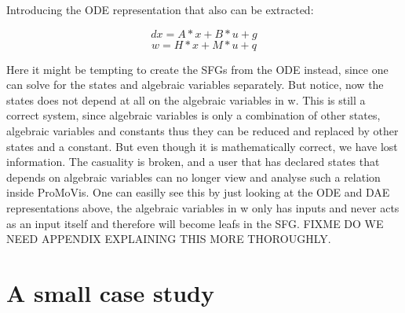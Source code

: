 Introducing the ODE representation that also can be extracted:

\begin{equation}
dx = A*x + B*u + g
\end{equation}
\begin{equation}
w  = H*x + M*u + q
\end{equation}

Here it might be tempting to create the SFGs from the ODE instead, since one can solve for the states and algebraic variables separately. But notice, now the states does not depend at all on the algebraic variables in w. This is still a correct system, since algebraic variables is only a combination of other states, algebraic variables and constants thus they can be reduced and replaced by other states and a constant. But even though it is mathematically correct, we have lost information. The casuality is broken, and a user that has declared states that depends on algebraic variables can no longer view and analyse such a relation inside ProMoVis. One can easilly see this by just looking at the ODE and DAE representations above, the algebraic variables in w only has inputs and never acts as an input itself and therefore will become leafs in the SFG. FIXME DO WE NEED APPENDIX EXPLAINING THIS MORE THOROUGHLY.
\section{A small case study}